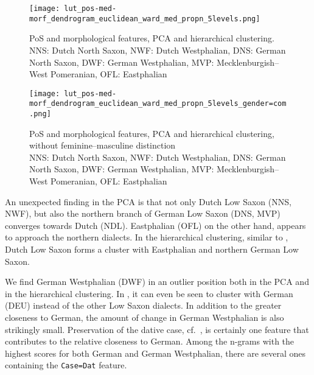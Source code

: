 \documentclass[output=paper,colorlinks,citecolor=brown]{langscibook}
\begin{document}
\begin{figure}
\begin{minipage}{0.48\textwidth}
    \centering
\end{minipage}\hfill%
\begin{minipage}{0.48\textwidth}
    \centering
    \texttt{[image: lut\_pos-med-morf\_dendrogram\_euclidean\_ward\_med\_propn\_5levels.png]}
    \caption{PoS and morphological features, PCA and hierarchical clustering.\\NNS: Dutch North Saxon, NWF: Dutch Westphalian, DNS: German North Saxon, DWF: German Westphalian, MVP: Mecklenburgish--West Pomeranian, OFL: Eastphalian}
\label{fig:posmorph_based_clusters}
\end{minipage}%
\end{figure}

\begin{figure}
\begin{minipage}{0.48\textwidth}
    \centering
    \frame{\texttt{[image: lut\_no-colours\_postag-un-morf\_kmeans\_3clusters\_med\_propn\_gender=com.png]}}
\end{minipage}\hfill%
\begin{minipage}{0.48\textwidth}
    \centering
    \texttt{[image: lut\_pos-med-morf\_dendrogram\_euclidean\_ward\_med\_propn\_5levels\_gender=com.png]}
    \caption{PoS and morphological features, PCA and hierarchical clustering, without feminine--masculine distinction
    \\NNS: Dutch North Saxon, NWF: Dutch Westphalian, DNS: German North Saxon, DWF: German Westphalian, MVP: Mecklenburgish--West Pomeranian, OFL: Eastphalian}
    \label{fig:posmorph_based_clusters_without_m-f}
\end{minipage}%
\end{figure}


An unexpected finding in the PCA is that not only Dutch Low Saxon (NNS, NWF), but also the northern branch of German Low Saxon (DNS, MVP) converges towards Dutch (NDL). Eastphalian (OFL) on the other hand, appears to approach the northern dialects. In the hierarchical clustering, similar to , Dutch Low Saxon forms a cluster with Eastphalian and northern German Low Saxon. 

We find German Westphalian (DWF) in an outlier position both in the PCA and in the hierarchical clustering. In , it can even be seen to cluster with German (DEU) instead of the other Low Saxon dialects. In addition to the greater closeness to German, the amount of change in German Westphalian is also strikingly small. Preservation of the dative case, cf.~, is certainly one feature that contributes to the relative closeness to German. Among the n-grams with the highest scores for both German and German Westphalian, there are several ones containing the \texttt{Case=Dat} feature. 
\end{document}
